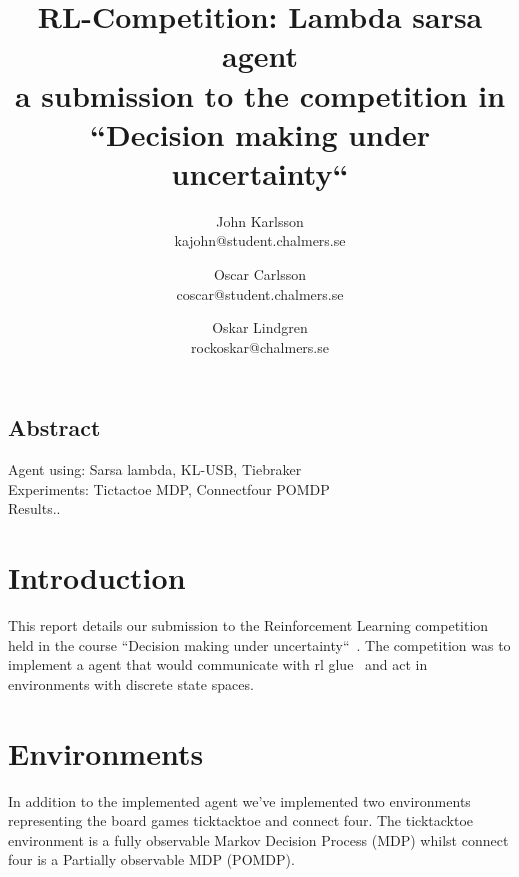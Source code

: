 \documentclass[letterpaper,twocolumn,10pt]{article}
\begin{document}
\date{}

\title{ RL-Competition: Lambda sarsa agent\\ \small a submission to the competition in ``Decision making under uncertainty``}

\author{
{\rm John Karlsson}\\
kajohn@student.chalmers.se
\and
{\rm Oscar Carlsson}\\
coscar@student.chalmers.se
\and
{\rm Oskar Lindgren}\\
rockoskar@chalmers.se
}

\maketitle

\thispagestyle{empty}


\subsection*{Abstract}
Agent using: Sarsa lambda, KL-USB, Tiebraker \\
Experiments: Tictactoe MDP, Connectfour POMDP \\
Results..

\section{Introduction}
This report details our submission to the Reinforcement Learning competition held in the course ``Decision making under uncertainty``~\cite{RLCOMP}. The competition was to implement a agent that would communicate with rl glue~\cite{rl-glue} and act in environments with discrete state spaces.


\section{Environments}
In addition to the implemented agent we've implemented two environments representing the board games ticktacktoe and connect four. The ticktacktoe environment is a fully observable Markov Decision Process (MDP) whilst connect four is a Partially observable MDP (POMDP).
\end{document}
